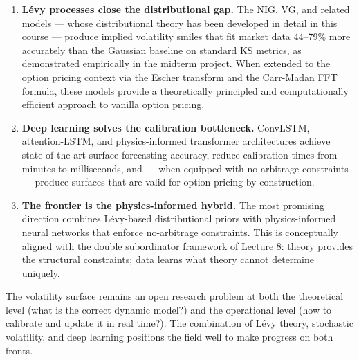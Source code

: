 \documentclass[12pt, a4paper]{article}
\begin{document}
\begin{enumerate}[label=(\roman*)]
  \item \textbf{L\'{e}vy processes close the distributional gap.}
        The NIG, VG, and related models --- whose distributional
        theory has been developed in detail in this course ---
        produce implied volatility smiles that fit market data
        44--79\% more accurately than the Gaussian baseline on standard
        KS metrics, as demonstrated empirically in the midterm project.
        When extended to the option pricing context via the Escher
        transform and the Carr-Madan FFT formula, these models provide
        a theoretically principled and computationally efficient
        approach to vanilla option pricing.

  \item \textbf{Deep learning solves the calibration bottleneck.}
        ConvLSTM, attention-LSTM, and physics-informed transformer
        architectures achieve state-of-the-art surface forecasting
        accuracy, reduce calibration times from minutes to
        milliseconds, and --- when equipped with no-arbitrage
        constraints --- produce surfaces that are valid for option
        pricing by construction.

  \item \textbf{The frontier is the physics-informed hybrid.}
        The most promising direction combines L\'{e}vy-based
        distributional priors with physics-informed neural networks
        that enforce no-arbitrage constraints. This is conceptually
        aligned with the double subordinator framework of Lecture 8:
        theory provides the structural constraints; data learns
        what theory cannot determine uniquely.
\end{enumerate}

The volatility surface remains an open research problem at both the
theoretical level (what is the correct dynamic model?) and the
operational level (how to calibrate and update it in real time?).
The combination of L\'{e}vy theory, stochastic volatility, and deep
learning positions the field well to make progress on both fronts.

\newpage


\end{document}

